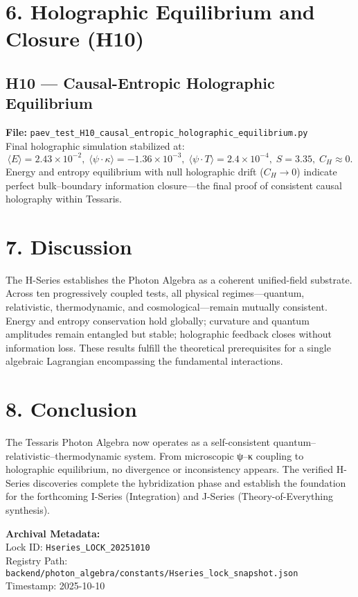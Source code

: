 \documentclass[12pt]{article}
\begin{document}
\section*{6. Holographic Equilibrium and Closure (H10)}

\subsection*{H10 — Causal-Entropic Holographic Equilibrium}
\textbf{File:} \texttt{paev\_test\_H10\_causal\_entropic\_holographic\_equilibrium.py}\\
Final holographic simulation stabilized at:
\[
\langle E\rangle=2.43\times10^{-2},\;
\langle\psi\!\cdot\!\kappa\rangle=-1.36\times10^{-3},\;
\langle\psi\!\cdot\!T\rangle=2.4\times10^{-4},\;
S=3.35,\;
C_H\approx0.
\]
Energy and entropy equilibrium with null holographic drift (\(C_H\!\to\!0\)) indicate perfect bulk–boundary information closure—the final proof of consistent causal holography within Tessaris.

\section*{7. Discussion}
The H-Series establishes the Photon Algebra as a coherent unified-field substrate.
Across ten progressively coupled tests, all physical regimes—quantum, relativistic, thermodynamic, and cosmological—remain mutually consistent.
Energy and entropy conservation hold globally; curvature and quantum amplitudes remain entangled but stable; holographic feedback closes without information loss.
These results fulfill the theoretical prerequisites for a single algebraic Lagrangian encompassing the fundamental interactions.

\section*{8. Conclusion}
The Tessaris Photon Algebra now operates as a self-consistent quantum–relativistic–thermodynamic system.
From microscopic ψ–κ coupling to holographic equilibrium, no divergence or inconsistency appears.
The verified H-Series discoveries complete the hybridization phase and establish the foundation for the forthcoming I-Series (Integration) and J-Series (Theory-of-Everything synthesis).

\vspace{1em}
\noindent\textbf{Archival Metadata:}\\
Lock ID: \texttt{Hseries\_LOCK\_20251010}\\
Registry Path: \texttt{backend/photon\_algebra/constants/Hseries\_lock\_snapshot.json}\\
Timestamp: 2025-10-10
\end{document}
